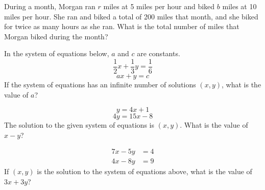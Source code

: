 During a month, Morgan ran $r$ miles at 5 miles per hour and biked $b$ miles at 10 miles per hour. She ran and biked a total of 200 miles that month, and she biked for twice as many hours as she ran. What is the total number of miles that Morgan biked during the month?

\vspace{0.75em}



\vspace{2em}
\noindent\markforreview

\vspace{1em}

In the system of equations below, \( a \) and \( c \) are constants.
\[
\frac{1}{2}x + \frac{1}{3}y = \frac{1}{6}
\]
\[
ax + y = c
\]
If the system of equations has an infinite number of solutions \( (x, y) \), what is the value of \( a \)?

\vspace{0.75em}


\newpage
\noindent\markforreview

\vspace{1em}

\[
y = 4x + 1
\]
\[
4y = 15x - 8
\]
The solution to the given system of equations is \( (x, y) \). What is the value of \( x - y \)?

\vspace{5em}



\noindent\markforreview

\vspace{1em}

\[
\begin{aligned}
7x - 5y &= 4 \\
4x - 8y &= 9
\end{aligned}
\]
If \( (x, y) \) is the solution to the system of equations above, what is the value of \( 3x + 3y \)?

\vspace{0.75em}



\newpage

\noindent\markforreview

\vspace{1em}

